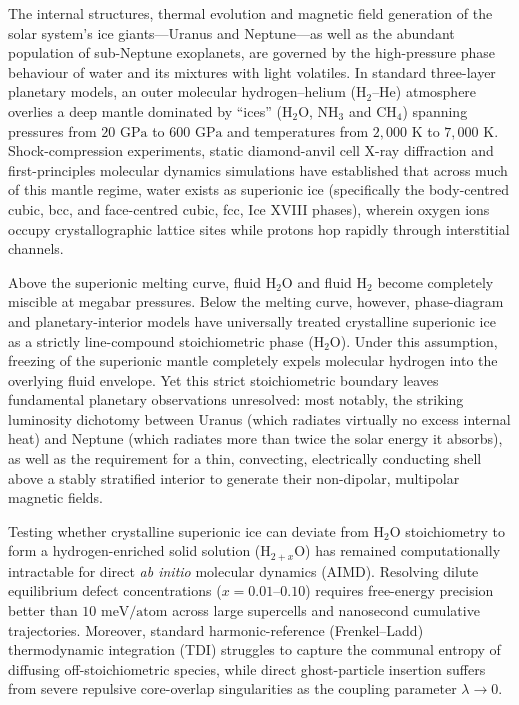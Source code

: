 \documentclass[twocolumn,secnumarabic,amssymb,nobibnotes,aps,prl,superscriptaddress,10pt]{revtex4-2}
\begin{document}
The internal structures, thermal evolution and magnetic field generation of the solar system's ice giants---Uranus and Neptune---as well as the abundant population of sub-Neptune exoplanets, are governed by the high-pressure phase behaviour of water and its mixtures with light volatiles\cite{Guillot2005,Helled2020}. In standard three-layer planetary models, an outer molecular hydrogen--helium ($\text{H}_2\text{--He}$) atmosphere overlies a deep mantle dominated by ``ices'' ($\text{H}_2\text{O}$, $\text{NH}_3$ and $\text{CH}_4$) spanning pressures from $20\text{ GPa}$ to $600\text{ GPa}$ and temperatures from $2,000\text{ K}$ to $7,000\text{ K}$. Shock-compression experiments\cite{Millot2018,Millot2019}, static diamond-anvil cell X-ray diffraction\cite{Prakapenka2021} and first-principles molecular dynamics simulations\cite{Cavazzoni1999,Wilson2013,Cheng2021} have established that across much of this mantle regime, water exists as superionic ice (specifically the body-centred cubic, bcc, and face-centred cubic, fcc, Ice XVIII phases), wherein oxygen ions occupy crystallographic lattice sites while protons hop rapidly through interstitial channels.

Above the superionic melting curve, fluid $\text{H}_2\text{O}$ and fluid $\text{H}_2$ become completely miscible at megabar pressures\cite{Soubiran2015}. Below the melting curve, however, phase-diagram and planetary-interior models have universally treated crystalline superionic ice as a strictly line-compound stoichiometric phase ($\text{H}_2\text{O}$). Under this assumption, freezing of the superionic mantle completely expels molecular hydrogen into the overlying fluid envelope. Yet this strict stoichiometric boundary leaves fundamental planetary observations unresolved: most notably, the striking luminosity dichotomy between Uranus (which radiates virtually no excess internal heat) and Neptune (which radiates more than twice the solar energy it absorbs)\cite{Pearl1991,Nettelmann2013}, as well as the requirement for a thin, convecting, electrically conducting shell above a stably stratified interior to generate their non-dipolar, multipolar magnetic fields\cite{Stanley2004}.

Testing whether crystalline superionic ice can deviate from $\text{H}_2\text{O}$ stoichiometry to form a hydrogen-enriched solid solution ($\text{H}_{2+x}\text{O}$) has remained computationally intractable for direct \textit{ab initio} molecular dynamics (AIMD). Resolving dilute equilibrium defect concentrations ($x = 0.01\text{--}0.10$) requires free-energy precision better than $10\text{ meV/atom}$ across large supercells and nanosecond cumulative trajectories. Moreover, standard harmonic-reference (Frenkel--Ladd) thermodynamic integration (TDI) struggles to capture the communal entropy of diffusing off-stoichiometric species, while direct ghost-particle insertion suffers from severe repulsive core-overlap singularities as the coupling parameter $\lambda \to 0$.
\end{document}
